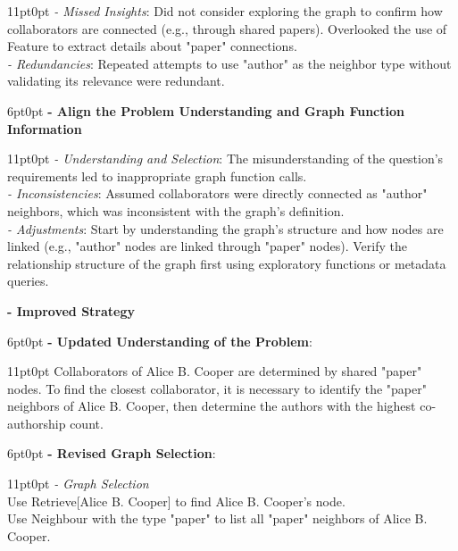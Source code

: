 \documentclass[11pt]{article}
\begin{document}
\begin{tcolorbox}[colback=white!10!white, colframe=blue!30!black, title=Reflection Process, boxrule=1pt, fontupper={\fontsize{7pt}{9pt}\selectfont}]
\begin{adjustwidth}{11pt}{0pt}
 \textit{- Missed Insights}: Did not consider exploring the graph to confirm how collaborators are connected (e.g., through shared papers). Overlooked the use of Feature to extract details about "paper" connections.\\
 \textit{- Redundancies}: Repeated attempts to use "author" as the neighbor type without validating its relevance were redundant.
\end{adjustwidth}
\begin{adjustwidth}{6pt}{0pt}
 \textbf{- Align the Problem Understanding and Graph Function Information}
\end{adjustwidth}
\begin{adjustwidth}{11pt}{0pt}
 \textit{- Understanding and Selection}: The misunderstanding of the question's requirements led to inappropriate graph function calls.\\
 \textit{- Inconsistencies}: Assumed collaborators were directly connected as "author" neighbors, which was inconsistent with the graph's definition.\\
 \textit{- Adjustments}: Start by understanding the graph's structure and how nodes are linked (e.g., "author" nodes are linked through "paper" nodes). Verify the relationship structure of the graph first using exploratory functions or metadata queries.
\end{adjustwidth}
\textbf{- Improved Strategy}
\begin{adjustwidth}{6pt}{0pt}
 \textbf{- Updated Understanding of the Problem}:
\end{adjustwidth}
\begin{adjustwidth}{11pt}{0pt}
    Collaborators of Alice B. Cooper are determined by shared "paper" nodes. To find the closest collaborator, it is necessary to identify the "paper" neighbors of Alice B. Cooper, then determine the authors with the highest co-authorship count.
\end{adjustwidth}
\begin{adjustwidth}{6pt}{0pt}
  \textbf{- Revised Graph Selection}:
\end{adjustwidth}
\begin{adjustwidth}{11pt}{0pt}
    \textit{- Graph Selection}\\
    Use Retrieve[Alice B. Cooper] to find Alice B. Cooper's node.\\
    Use Neighbour with the type "paper" to list all "paper" neighbors of Alice B. Cooper.


\end{adjustwidth}
\end{tcolorbox}
\end{document}
